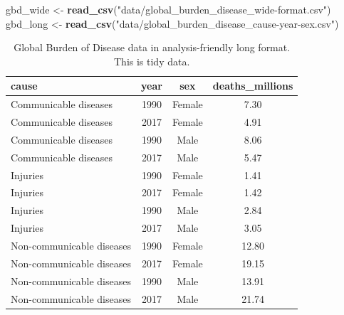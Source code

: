 \documentclass[
  12pt,
  krantz2]{krantz}
\makeatletter
\newenvironment{Shaded}{\begin{snugshade}}{\end{snugshade}}
\newcommand{\KeywordTok}[1]{\textcolor[rgb]{0.13,0.29,0.53}{\textbf{#1}}}
\newcommand{\NormalTok}[1]{#1}
\newcommand{\StringTok}[1]{\textcolor[rgb]{0.31,0.60,0.02}{#1}}
\newenvironment{kframe}{%
\medskip{}
\setlength{\fboxsep}{.8em}
 \def\at@end@of@kframe{}%
 \ifinner\ifhmode%
  \def\at@end@of@kframe{\end{minipage}}%
  \begin{minipage}{\columnwidth}%
 \fi\fi%
 \def\FrameCommand##1{\hskip\@totalleftmargin \hskip-\fboxsep
 \colorbox{shadecolor}{##1}\hskip-\fboxsep
     \hskip-\linewidth \hskip-\@totalleftmargin \hskip\columnwidth}%
 \MakeFramed {\advance\hsize-\width
   \@totalleftmargin\z@ \linewidth\hsize
   \@setminipage}}%
 {\par\unskip\endMakeFramed%
 \at@end@of@kframe}
\renewenvironment{Shaded}{\begin{kframe}}{\end{kframe}}
\makeatother
\begin{document}
\begin{Shaded}
\begin{Highlighting}[]
\NormalTok{gbd_wide <-}\StringTok{ }\KeywordTok{read_csv}\NormalTok{(}\StringTok{"data/global_burden_disease_wide-format.csv"}\NormalTok{)}
\NormalTok{gbd_long <-}\StringTok{ }\KeywordTok{read_csv}\NormalTok{(}\StringTok{"data/global_burden_disease_cause-year-sex.csv"}\NormalTok{)}
\end{Highlighting}
\end{Shaded}

\begin{table}[!h]

\caption{\label{tab:chap3-tab-gbd-wide}Global Burden of Disease data in human-readable wide format. This is not tidy data.}
\centering
{}
\end{table}

\begin{table}[!h]

\caption{\label{tab:chap3-tab-gbd-long}Global Burden of Disease data in analysis-friendly long format. This is tidy data.}
\centering
\fontsize{10}{12}\selectfont
\begin{tabular}[t]{lccc}
\toprule
cause & year & sex & deaths\_millions\\
\midrule
Communicable diseases & 1990 & Female & 7.30\\
Communicable diseases & 2017 & Female & 4.91\\
Communicable diseases & 1990 & Male & 8.06\\
Communicable diseases & 2017 & Male & 5.47\\
\addlinespace
Injuries & 1990 & Female & 1.41\\
Injuries & 2017 & Female & 1.42\\
Injuries & 1990 & Male & 2.84\\
Injuries & 2017 & Male & 3.05\\
\addlinespace
Non-communicable diseases & 1990 & Female & 12.80\\
Non-communicable diseases & 2017 & Female & 19.15\\
Non-communicable diseases & 1990 & Male & 13.91\\
Non-communicable diseases & 2017 & Male & 21.74\\
\bottomrule
\end{tabular}
\end{table}
\end{document}
